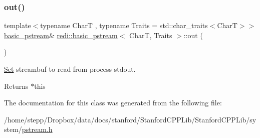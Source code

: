 \subsubsection{\texorpdfstring{out()}{out()}}
{\footnotesize\ttfamily template$<$typename CharT , typename Traits  = std\+::char\+\_\+traits$<$\+Char\+T$>$$>$ \\
\mbox{\hyperlink{classredi_1_1basic__pstream}{basic\+\_\+pstream}}\& \mbox{\hyperlink{classredi_1_1basic__pstream}{redi\+::basic\+\_\+pstream}}$<$ CharT, Traits $>$\+::out (\begin{DoxyParamCaption}{ }\end{DoxyParamCaption})\hspace{0.3cm}{\ttfamily [inline]}}



\mbox{\hyperlink{classSet}{Set}} streambuf to read from process\textquotesingle{} {\ttfamily stdout}. 

\begin{DoxyReturn}{Returns}
{\ttfamily $\ast$this} 
\end{DoxyReturn}


The documentation for this class was generated from the following file\+:\begin{DoxyCompactItemize}
\item 
/home/stepp/\+Dropbox/data/docs/stanford/\+Stanford\+C\+P\+P\+Lib/\+Stanford\+C\+P\+P\+Lib/system/\mbox{\hyperlink{pstream_8h}{pstream.\+h}}\end{DoxyCompactItemize}
